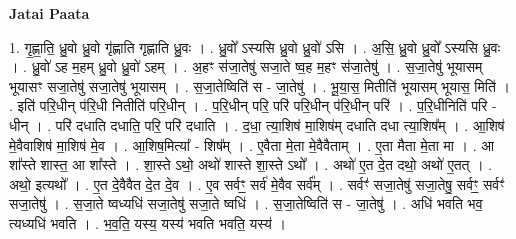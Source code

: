 \documentclass[17pt]{extarticle}
\begin{document}
\textbf{Jatai Paata} \newline

1. गृ॒ह्णा॒ति॒ ध्रु॒वो ध्रु॒वो गृ॑ह्णाति गृह्णाति ध्रु॒वः । . ध्रु॒वो᳚ ऽस्यसि ध्रु॒वो ध्रु॒वो॑ ऽसि । . अ॒सि॒ ध्रु॒वो ध्रु॒वो᳚ ऽस्यसि ध्रु॒वः । . ध्रु॒वो॑ ऽह म॒हम् ध्रु॒वो ध्रु॒वो॑ ऽहम् । . अ॒हꣳ स॑जा॒तेषु॑ सजा॒ते ष्व॒ह म॒हꣳ स॑जा॒तेषु॑ । . स॒जा॒तेषु॑ भूयासम् भूयासꣳ सजा॒तेषु॑ सजा॒तेषु॑ भूयासम् । . स॒जा॒तेष्विति॑ स - जा॒तेषु॑ । . भू॒या॒स॒ मितीति॑ भूयासम् भूयास॒ मिति॑ । . इति॑ परि॒धीन् प॑रि॒धी नितीति॑ परि॒धीन् । . प॒रि॒धीन् परि॒ परि॑ परि॒धीन् प॑रि॒धीन् परि॑ । . प॒रि॒धीनिति॑ परि - धीन् । . परि॑ दधाति दधाति॒ परि॒ परि॑ दधाति । . द॒धा॒ त्या॒शिष॑ मा॒शिष॑म् दधाति दधा त्या॒शिष᳚म् । . आ॒शिष॑ मे॒वैवाशिष॑ मा॒शिष॑ मे॒व । . आ॒शिष॒मित्या᳚ - शिष᳚म् । . ए॒वैता मे॒ता मे॒वैवैताम् । . ए॒ता मैता मे॒ता मा । . आ शा᳚स्ते शास्त॒ आ शा᳚स्ते । . शा॒स्ते ऽथो॒ अथो॑ शास्ते शा॒स्ते ऽथो᳚ । . अथो॑ ए॒त दे॒त दथो॒ अथो॑ ए॒तत् । . अथो॒ इत्यथो᳚ । . ए॒त दे॒वैवैत दे॒त दे॒व । . ए॒व सर्वꣳ॒॒ सर्व॑ मे॒वैव सर्व᳚म् । . सर्वꣳ॑ सजा॒तेषु॑ सजा॒तेषु॒ सर्वꣳ॒॒ सर्वꣳ॑ सजा॒तेषु॑ । . स॒जा॒ते ष्वध्यधि॑ सजा॒तेषु॑ सजा॒ते ष्वधि॑ । . स॒जा॒तेष्विति॑ स - जा॒तेषु॑ । . अधि॑ भवति भव॒ त्यध्यधि॑ भवति । . भ॒व॒ति॒ यस्य॒ यस्य॑ भवति भवति॒ यस्य॑ । \newline
\end{document}
